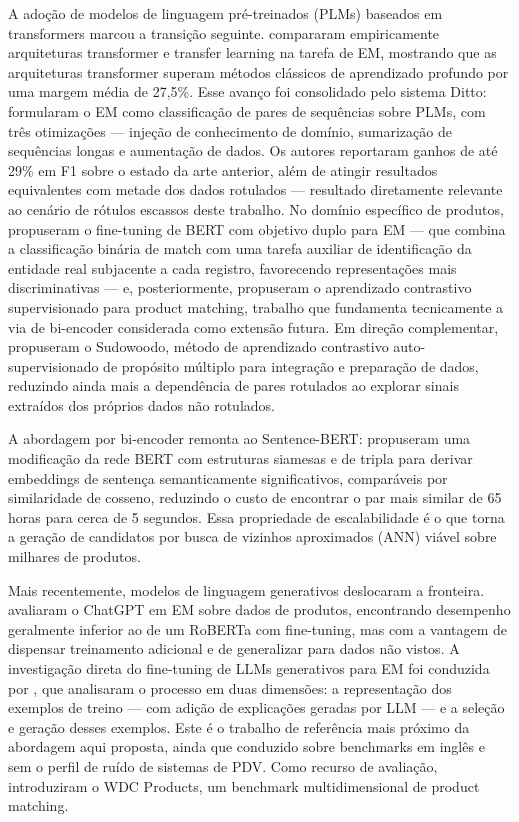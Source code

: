 \documentclass[
    article,
    12pt,
    oneside,
    a4paper,
    english,
    brazilian
    ]{abntex2}
\numberwithin{equation}{section}
\begin{document}
A adoção de modelos de linguagem pré-treinados (PLMs) baseados em transformers marcou a transição seguinte.  compararam empiricamente arquiteturas transformer e transfer learning na tarefa de EM, mostrando que as arquiteturas transformer superam métodos clássicos de aprendizado profundo por uma margem média de 27,5\%. Esse avanço foi consolidado pelo sistema Ditto:  formularam o EM como classificação de pares de sequências sobre PLMs, com três otimizações --- injeção de conhecimento de domínio, sumarização de sequências longas e aumentação de dados. Os autores reportaram ganhos de até 29\% em F1 sobre o estado da arte anterior, além de atingir resultados equivalentes com metade dos dados rotulados --- resultado diretamente relevante ao cenário de rótulos escassos deste trabalho. No domínio específico de produtos,  propuseram o fine-tuning de BERT com objetivo duplo para EM --- que combina a classificação binária de match com uma tarefa auxiliar de identificação da entidade real subjacente a cada registro, favorecendo representações mais discriminativas --- e, posteriormente,  propuseram o aprendizado contrastivo supervisionado para product matching, trabalho que fundamenta tecnicamente a via de bi-encoder considerada como extensão futura. Em direção complementar,  propuseram o Sudowoodo, método de aprendizado contrastivo auto-supervisionado de propósito múltiplo para integração e preparação de dados, reduzindo ainda mais a dependência de pares rotulados ao explorar sinais extraídos dos próprios dados não rotulados.

A abordagem por bi-encoder remonta ao Sentence-BERT:  propuseram uma modificação da rede BERT com estruturas siamesas e de tripla para derivar embeddings de sentença semanticamente significativos, comparáveis por similaridade de cosseno, reduzindo o custo de encontrar o par mais similar de 65 horas para cerca de 5 segundos. Essa propriedade de escalabilidade é o que torna a geração de candidatos por busca de vizinhos aproximados (ANN) viável sobre milhares de produtos.

Mais recentemente, modelos de linguagem generativos deslocaram a fronteira.  avaliaram o ChatGPT em EM sobre dados de produtos, encontrando desempenho geralmente inferior ao de um RoBERTa com fine-tuning, mas com a vantagem de dispensar treinamento adicional e de generalizar para dados não vistos. A investigação direta do fine-tuning de LLMs generativos para EM foi conduzida por , que analisaram o processo em duas dimensões: a representação dos exemplos de treino --- com adição de explicações geradas por LLM --- e a seleção e geração desses exemplos. Este é o trabalho de referência mais próximo da abordagem aqui proposta, ainda que conduzido sobre benchmarks em inglês e sem o perfil de ruído de sistemas de PDV. Como recurso de avaliação,  introduziram o WDC Products, um benchmark multidimensional de product matching.
\end{document}
